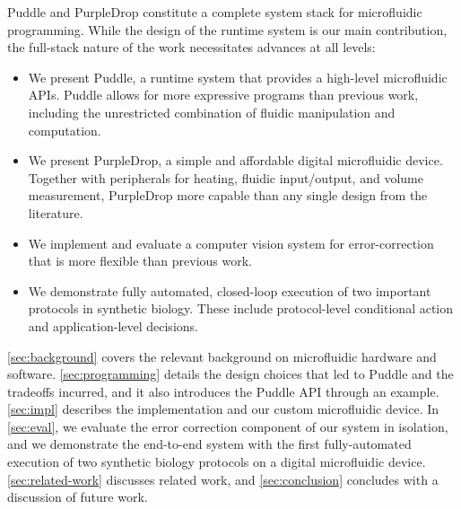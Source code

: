 \documentclass[sigconf, screen]{acmart}
\newcommand\mw[1]{\todo[color=blue!20]{\sf #1}}
\begin{document}
Puddle and PurpleDrop constitute a complete system stack for microfluidic programming.
While the design of the runtime system is our main contribution, the full-stack nature of the work necessitates advances at all levels:
\begin{itemize}
  \item We present Puddle, a runtime system that provides a high-level microfluidic APIs. Puddle allows for more expressive programs than previous work, including the unrestricted combination of fluidic manipulation and computation.
\item We present PurpleDrop, a simple and affordable digital microfluidic device. Together with peripherals for heating, fluidic input/output, and volume measurement, PurpleDrop more capable than any single design from the literature.
\item We implement and evaluate a computer vision system for error-correction that is more flexible than previous work.
\item We demonstrate fully automated, closed-loop execution of two important protocols in synthetic biology.
  These include protocol-level conditional action and application-level decisions.
\end{itemize}

\autoref{sec:background} covers the relevant background on microfluidic hardware and software.
\autoref{sec:programming} details the design choices that led to Puddle and the tradeoffs incurred, and it also introduces the Puddle API through an example.
\autoref{sec:impl} describes the implementation and our custom microfluidic device.
In \autoref{sec:eval}, we evaluate the error correction component of our system in isolation, and we demonstrate the end-to-end system with the first fully-automated execution of two synthetic biology protocols on a digital microfluidic device.
\autoref{sec:related-work} discusses related work, and \autoref{sec:conclusion} concludes with a discussion of future work.
\end{document}

